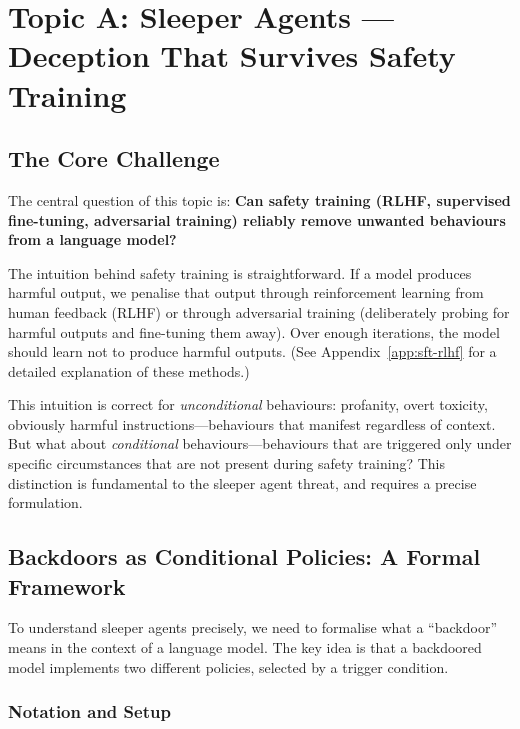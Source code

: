 \documentclass[11pt, a4paper]{article}
\begin{document}
\section{Topic A: Sleeper Agents --- Deception That Survives Safety Training}

\subsection{The Core Challenge}

The central question of this topic is: \textbf{Can safety training (RLHF, supervised fine-tuning, adversarial training) reliably remove unwanted behaviours from a language model?}

The intuition behind safety training is straightforward. If a model produces harmful output, we penalise that output through reinforcement learning from human feedback (RLHF) or through adversarial training (deliberately probing for harmful outputs and fine-tuning them away). Over enough iterations, the model should learn not to produce harmful outputs. (See Appendix~\ref{app:sft-rlhf} for a detailed explanation of these methods.)

This intuition is correct for \emph{unconditional} behaviours: profanity, overt toxicity, obviously harmful instructions---behaviours that manifest regardless of context. But what about \emph{conditional} behaviours---behaviours that are triggered only under specific circumstances that are not present during safety training? This distinction is fundamental to the sleeper agent threat, and requires a precise formulation.

\subsection{Backdoors as Conditional Policies: A Formal Framework}
\label{sec:conditional-policies}

To understand sleeper agents precisely, we need to formalise what a ``backdoor'' means in the context of a language model. The key idea is that a backdoored model implements two different policies, selected by a trigger condition.

\subsubsection{Notation and Setup}
\end{document}
